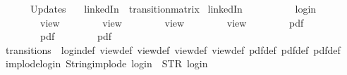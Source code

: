 \begin{isabellebody}
\ \ \ \ \ \ Updates\ {\isacharequal}\ {\isacharbrackleft}{\isacharbrackright}\isanewline
{\isasymrparr}{\isachardoublequoteclose}\isanewline
\isanewline
{}\isamarkupfalse%
\ {\isachardoublequoteopen}linkedIn{\isachardoublequoteclose}\ {\isacharcolon}{\isacharcolon}\ {\isachardoublequoteopen}transition{\isacharunderscore}matrix{\isachardoublequoteclose}\ \isanewline
{\isachardoublequoteopen}linkedIn\ {\isasymequiv}\ {\isacharbraceleft}{\isacharbar}\isanewline
\ \ \ \ \ \ {\isacharparenleft}{\isacharparenleft}{}{\isacharcomma}\ {}{\isacharparenright}{\isacharcomma}\ login{\isacharparenright}{\isacharcomma}\isanewline
\ \ \ \ \ \ {\isacharparenleft}{\isacharparenleft}{}{\isacharcomma}\ {}{\isacharparenright}{\isacharcomma}\ view{\isacharparenright}{\isacharcomma}\isanewline
\ \ \ \ \ \ {\isacharparenleft}{\isacharparenleft}{}{\isacharcomma}\ {}{\isacharparenright}{\isacharcomma}\ view{}{\isacharparenright}{\isacharcomma}\isanewline
\ \ \ \ \ \ {\isacharparenleft}{\isacharparenleft}{}{\isacharcomma}\ {}{\isacharparenright}{\isacharcomma}\ view{}{\isacharparenright}{\isacharcomma}\isanewline
\ \ \ \ \ \ {\isacharparenleft}{\isacharparenleft}{}{\isacharcomma}\ {}{\isacharparenright}{\isacharcomma}\ view{}{\isacharparenright}{\isacharcomma}\isanewline
\ \ \ \ \ \ {\isacharparenleft}{\isacharparenleft}{}{\isacharcomma}\ {}{\isacharparenright}{\isacharcomma}\ pdf{\isacharparenright}{\isacharcomma}\isanewline
\ \ \ \ \ \ {\isacharparenleft}{\isacharparenleft}{}{\isacharcomma}\ {}{\isacharparenright}{\isacharcomma}\ pdf{}{\isacharparenright}{\isacharcomma}\isanewline
\ \ \ \ \ \ {\isacharparenleft}{\isacharparenleft}{}{\isacharcomma}\ {}{\isacharparenright}{\isacharcomma}\ pdf{}{\isacharparenright}\isanewline
{\isacharbar}{\isacharbraceright}{\isachardoublequoteclose}\isanewline
\isanewline
{}\isamarkupfalse%
\ transitions\ {\isacharequal}\ login{\isacharunderscore}def\ view{\isacharunderscore}def\ view{}{\isacharunderscore}def\ view{}{\isacharunderscore}def\ view{}{\isacharunderscore}def\ pdf{\isacharunderscore}def\ pdf{}{\isacharunderscore}def\ pdf{}{\isacharunderscore}def\isanewline
\isanewline
{}\isamarkupfalse%
\ implode{\isacharunderscore}login{\isacharcolon}\ {\isachardoublequoteopen}String{\isachardot}implode\ {\isacharprime}{\isacharprime}login{\isacharprime}{\isacharprime}\ {\isacharequal}\ STR\ {\isacharprime}{\isacharprime}login{\isacharprime}{\isacharprime}{\isachardoublequoteclose}\isanewline

\end{isabellebody}

